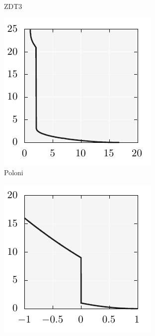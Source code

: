 \documentclass{stdlocal}
\begin{document}
\begin{figure}[t]
\begin{subfigure}[b]{0.24\textwidth}
        \caption{ZDT3}
      \end{subfigure}
      \begin{subfigure}[b]{0.24\textwidth}
        \center
        \includegraphics[width=\textwidth]{../../plots/poloni2_wrong.pdf}
        \caption{Poloni}
      \end{subfigure}
      \begin{subfigure}[b]{0.24\textwidth}
        \center
        \includegraphics[width=\textwidth]{../../plots/schaffer2_wrong.pdf}

\end{subfigure}
\end{figure}
\end{document}
